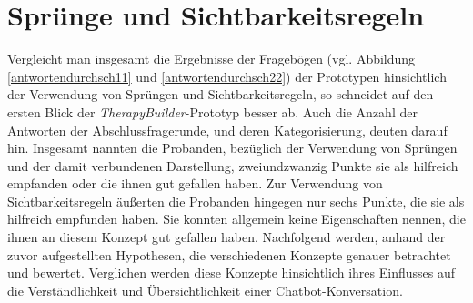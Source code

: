 \section{Sprünge und Sichtbarkeitsregeln}
Vergleicht man insgesamt die Ergebnisse der Fragebögen (vgl. Abbildung \ref{antwortendurchsch11} und \ref{antwortendurchsch22}) der Prototypen hinsichtlich der Verwendung von Sprüngen und Sichtbarkeitsregeln, so schneidet auf den ersten Blick der \emph{TherapyBuilder}-Prototyp besser ab. Auch die Anzahl der Antworten  der Abschlussfragerunde, und deren Kategorisierung, deuten darauf hin. Insgesamt nannten die Probanden, bezüglich der Verwendung von Sprüngen und der damit verbundenen Darstellung, zweiundzwanzig Punkte sie als hilfreich empfanden oder die ihnen gut gefallen haben. Zur Verwendung von Sichtbarkeitsregeln äußerten die Probanden hingegen nur sechs Punkte, die sie als hilfreich empfunden haben. Sie konnten allgemein keine Eigenschaften nennen, die ihnen an diesem Konzept gut gefallen haben. Nachfolgend werden, anhand der zuvor aufgestellten Hypothesen, die verschiedenen Konzepte genauer betrachtet und bewertet. Verglichen werden diese Konzepte hinsichtlich ihres Einflusses auf die Verständlichkeit und Übersichtlichkeit einer Chatbot-Konversation.


